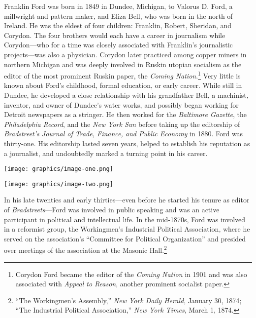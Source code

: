 \documentclass[openany,nobib]{tufte-book}
\begin{document}
Franklin Ford was born in 1849 in Dundee, Michigan, to Valorus D. Ford,
a millwright and pattern maker, and Eliza Bell, who was born in the
north of Ireland. He was the eldest of four children: Franklin, Robert,
Sheridan, and Corydon. The four brothers would each have a career in
journalism while Corydon---who for a time was closely associated with
Franklin's journalistic projects---was also a physician. Corydon later
practiced among copper miners in northern Michigan and was deeply
involved in Ruskin utopian socialism as the editor of the most prominent
Ruskin paper, the \emph{Coming Nation}.\footnote{Corydon Ford became the
  editor of the \emph{Coming Nation} in 1901 and was also associated
  with \emph{Appeal to Reason}, another prominent socialist paper.} Very
little is known about Ford's childhood, formal education, or early
career. While still in Dundee, he developed a close relationship with
his grandfather Bell, a machinist, inventor, and owner of Dundee's water
works, and possibly began working for Detroit newspapers as a stringer.
He then worked for the \emph{Baltimore Gazette}, the \emph{Philadelphia
Record}, and the \emph{New York Sun} before taking up the editorship of
\emph{Bradstreet's Journal of Trade, Finance, and Public Economy} in
1880. Ford was thirty-one. His editorship lasted seven years, helped to
establish his reputation as a journalist, and undoubtedly marked a
turning point in his career.

\begin{figure*}
   \texttt{[image: graphics/image-one.png]}
   \label{fig:fig1}
\end{figure*}

\begin{figure*}
   \texttt{[image: graphics/image-two.png]}
   \label{fig:fig2}
\end{figure*}

In his late twenties and early thirties---even before he started his
tenure as editor of \emph{Bradstreet\textquotesingle s}---Ford was
involved in public speaking and was an active participant in political
and intellectual life. In the mid-1870s, Ford was involved in a
reformist group, the Workingmen's Industrial Political Association,
where he served on the association's ``Committee for Political
Organization'' and presided over meetings of the association at the
Masonic Hall.\footnote{``The Workingmen's Assembly,'' \emph{New York
  Daily Herald}, January 30, 1874; ``The Industrial Political
  Association,'' \emph{New York Times}, March 1, 1874.}
\end{document}
